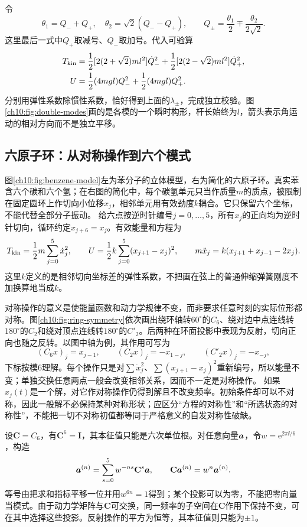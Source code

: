 令
\[
 \theta_1=Q_-+Q_+,\quad\theta_2=\sqrt2(Q_--Q_+),
 \qquad Q_\pm=\frac{\theta_1}{2}\mp\frac{\theta_2}{2\sqrt2}.
\]
这里最后一式中$Q_+$取减号、$Q_-$取加号。代入可验算
\begin{align*}
 T_{\rm kin}&=\frac12[2(2+\sqrt2)ml^2]\dot Q_-^2
 +\frac12[2(2-\sqrt2)ml^2]\dot Q_+^2,\\
 U&=\frac12(4mgl)Q_-^2+\frac12(4mgl)Q_+^2.
\end{align*}
分别用弹性系数除惯性系数，恰好得到上面的$\lambda_\pm$，完成独立校验。图\ref{ch10:fig:double-modes}画的是各模的一个瞬时构形，杆长始终为$l$，箭头表示角运动的相对方向而不是独立平移。
\chTenDoubleModesFigure

\subsection{六原子环：从对称操作到六个模式}
图\ref{ch10:fig:benzene-model}左为苯分子的立体模型，右为简化的六原子环。真实苯含六个碳和六个氢；在右图的简化中，每个碳氢单元只当作质量$m$的质点，被限制在固定圆环上作切向小位移$x_j$，相邻单元用有效劲度$k$耦合。它只保留六个坐标，不能代替全部分子振动。
\chTenBenzeneModelFigure
给六点按逆时针编号$j=0,\ldots,5$，所有$x_j$的正向均为逆时针切向，循环约定$x_{j+6}=x_j$。有效能量和方程为
\[
 T_{\rm kin}=\frac12m\sum_{j=0}^5\dot x_j^2,\qquad
 U=\frac12k\sum_{j=0}^5(x_{j+1}-x_j)^2,
 \qquad m\ddot x_j=k(x_{j+1}+x_{j-1}-2x_j).
\]
这里$k$定义的是相邻切向坐标差的弹性系数，不把画在弦上的普通伸缩弹簧刚度不加换算地当成$k$。

对称操作的意义是使能量函数和动力学规律不变，而非要求任意时刻的实际位形都对称。图\ref{ch10:fig:ring-symmetry}依次画出绕环轴转$60^\circ$的$C_6$、绕对边中点连线转$180^\circ$的$C_2$和绕对顶点连线转$180^\circ$的$C'_2$。后两种在环面投影中表现为反射，切向正向也随之反转。以图中轴为例，其作用可写为
\[
 (C_6x)_j=x_{j-1},\qquad (C_2x)_j=-x_{1-j},\qquad
 (C'_2x)_j=-x_{-j},
\]
下标按模6理解。每个操作只是对$\sum\dot x_j^2$、$\sum(x_{j+1}-x_j)^2$重新编号，所以能量不变；单独交换任意两点一般会改变相邻关系，因而不一定是对称操作。
\chTenRingSymmetryFigure
如果$x_j(t)$是一个解，对它作对称操作仍得到解且不改变频率。初始条件却可以不对称，因此一般解不必保持某种对称形状；应区分“方程的对称性”和“所选状态的对称性”，不能把一切不对称初值都等同于严格意义的自发对称性破缺。

设$\mathbf C=C_6$，有$\mathbf C^6=\mathbf I$，其本征值只能是六次单位根。对任意向量$\bm{a}$，令$w=\mathrm e^{2\pi\ii/6}$，构造
\[
 \bm{a}^{(n)}=\sum_{s=0}^5w^{-ns}\mathbf C^s\bm{a},
 \qquad\mathbf C\bm{a}^{(n)}=w^n\bm{a}^{(n)}.
\]
等号由把求和指标平移一位并用$w^{6n}=1$得到；某个投影可以为零，不能把零向量当模式。由于动力学矩阵与$\mathbf C$可交换，同一频率的子空间在$\mathbf C$作用下保持不变，可在其中选择这些投影。反射操作的平方为恒等，其本征值则只能为$\pm1$。

